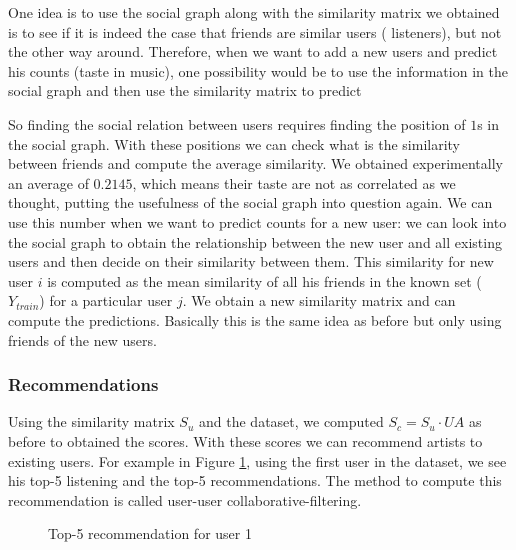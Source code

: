 \documentclass{article} %
\begin{document}
One idea is to use the social graph along with the similarity matrix we obtained is to see if it is indeed the case that friends are similar users ( listeners), but not the other way around. Therefore, when we want to add a new users and predict his counts (taste in music), one possibility would be to use the information in the social graph and then use the similarity matrix to predict

So finding the social relation between users requires finding the position of $1$s in the social graph. With these positions we can check what is the similarity between friends and compute the average similarity. We obtained experimentally an average of $0.2145$, which means their taste are not as correlated as we thought, putting the usefulness of the social graph into question again. We can use this number when we want to predict counts for a new user: we can look into the social graph to obtain the relationship between the new user and all existing users and then decide on their similarity between them. This similarity for new user $i$ is computed as the mean similarity of all his friends in the known set ($Y_{train}$) for a particular user $j$. We obtain a new similarity matrix and can compute the predictions. Basically this is the same idea as before but only using friends of the new users.
\subsubsection{Recommendations}
Using the similarity matrix $S_u$ and the dataset, we computed $S_c = S_u \cdot UA$ as before to obtained the scores. With these scores we can recommend artists to existing users. For example in Figure \ref{fig:rec}, using the first user in the dataset, we see his top-5 listening and the top-5 recommendations. The method to compute this recommendation is called user-user collaborative-filtering.
\begin{figure}[h!]
\centering     %
{}

\caption{Top-5 recommendation for user 1}
\label{fig:rec}
\end{figure}
\end{document}
